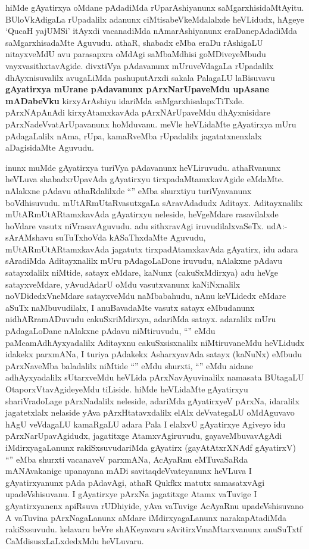 \begin{artha}
hiMde gAyatirxya oMdane pAdadiMda rUparAshiyanunx saMgarxhisidaMtAyitu. BUloVkAdigaLa rUpadalilx adanunx ciMtisabeVkeMdalalxde heVLidudx, hAgeye `QucaH yajUMSi' itAyxdi vacanadiMda nAmarAshiyanunx eraDanepAdadiMda saMgarxhisadaMte Aguvudu. athaR, shabadx eMba eraDu rAshigaLU nitayxveMdU avu parasapxra oMdAgi saMbaMdhisi goMDiveyeMbudu vayxvasithxtavAgide. divxtiVya pAdavanunx mUruveVdagaLa rUpadalilx dhAyxnisuvalilx avugaLiMda pashuputArxdi sakala PalagaLU laBisuvavu \textbf{gAyatirxya mUrane pAdavanunx pArxNarUpaveMdu upAsane mADabeVku} kirxyArAshiyu idariMda saMgarxhisalapxTiTxde. pArxNApAnAdi kirxyAtamxkavAda pArxNArUpaveMdu dhAyxnisidare pArxNadeVvatArUpavanunx hoMduvanu. meVle heVLidaMte gAyatirxya mUru pAdagaLalilx nAma, rUpa, kamaRveMba rUpadalilx jagatatxnenxlalx aDagisidaMte Aguvudu.
\end{artha}

\begin{artha}
inunx muMde gAyatirxya turiVya pAdavanunx heVLiruvudu. athaRvanunx heVLuva shabadxrUpavAda gAyatirxyu tirxpadaMtamxkavAgide eMdaMte. nAlakxne pAdavu athaRdalilxde ``\stext'' eMba shurxtiyu turiVyavanunx boVdhisuvudu. mUtARmUtaRvasutxgaLa sAravAdadudx Aditayx. Aditayxnalilx mUtARmUtARtamxkavAda gAyatirxyu neleside, heVgeMdare rasavilalxde hoVdare vasutx niVrasavAguvudu. adu sithxravAgi iruvudilalxvaSeTx. udA:- sArAMshavu suTuTxhoVda kASaThxdaMte Aguvudu, mUtARmUtARtamxkavAda jagatutx tirxpadAtamxkavAda gAyatirx, idu adara sAradiMda Aditayxnalilx mUru pAdagoLaDone iruvudu, nAlakxne pAdavu satayxdalilx niMtide, satayx eMdare, kaNunx (cakuSxMdirxya) adu heVge satayxveMdare, yAvudAdarU oMdu vasutxvanunx kaNiNxnalilx noVDidedxVneMdare satayxveMdu naMbabahudu, nAnu keVLidedx eMdare aSuTx naMbuvudilalx, I anuBavadaMte vasutx satayx eMbudanunx nidhARramADuvudu cakuSxriMdirxya, adariMda satayx. adaralilx mUru pAdagaLoDane nAlakxne pAdavu niMtiruvudu, ``\stext'' eMdu paMcamAdhAyxyadalilx Aditayxnu cakuSxsisxnalilx niMtiruvaneMdu heVLidudx idakekx parxmANa, I turiya pAdakekx AsharxyavAda satayx (kaNuNx) eMbudu pArxNaveMba baladalilx niMtide ``\stext'' eMdu shurxti, ``\stext'' eMdu aidane adhAyxyadalilx sUtarxveMdu heVLida pArxNavAyuvinalilx namasata BUtagaLU OtaporxVtavAgideyeMdu tiLiside. hiMde heVLidaMte gAyatirxyu shariVradoLage pArxNadalilx neleside, adariMda gAyatirxyeV pArxNa, idaralilx jagatetxlalx nelaside yAva pArxHtatavxdalilx elAlx deVvategaLU oMdAguvavo hAgU veVdagaLU kamaRgaLU adara Pala I elalxvU gAyatirxye Agiveyo idu pArxNarUpavAgidudx, jagatitxge AtamxvAgiruvudu, gayaveMbuvavAgAdi iMdirxyagaLanunx rakiSxsuvudariMda gAyatirx (gayAtAtxrXNAdf gAyatirxV) ``\stext'' eMba shurxti vacanaveV parxmANa, AcAyaRnu eMTuvaSaRda mANAvakanige upanayana mADi savitaqdeVvateyanunx heVLuva I gAyatirxyanunx pAda pAdavAgi, athaR Qukfkx matutx samasatxvAgi upadeVshisuvanu. I gAyatirxye pArxNa jagatitxge Atamx vaTuvige I gAyatirxyanenx apiRsuva rUDhiyide, yAva vaTuvige AcAyaRnu upadeVshisuvano A vaTuvina pArxNagaLanunx aMdare iMdirxyagaLanunx narakapAtadiMda rakiSxsuvudu. kelavaru beVre shAKeyavaru sAvitirxVmaMtarxvanunx anuSuTxtf CaMdisusxLaLxdedxMdu heVLuvaru.
\end{artha}

